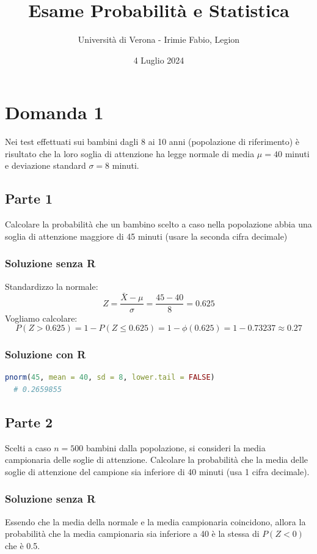 \documentclass[a4paper]{article}
\theoremstyle{break}
\theoremstyle{break}
\theoremstyle{break}
\theoremstyle{break}
\begin{document}
\title{Esame Probabilità e Statistica}
\author{Università di Verona - Irimie Fabio, Legion}
\date{4 Luglio 2024}
\maketitle

\tableofcontents
\pagebreak

\section{Domanda 1}
Nei test effettuati sui bambini dagli 8 ai 10 anni (popolazione
di riferimento) è risultato che la loro soglia di attenzione ha
legge normale di media \( \mu = 40 \)  minuti e deviazione standard  
\( \sigma = 8 \)  minuti.

\subsection{Parte 1}
Calcolare la probabilità che un bambino scelto a caso nella
popolazione abbia una soglia di attenzione maggiore di 45 minuti
(usare la seconda cifra decimale)

\subsubsection{Soluzione senza R}
Standardizzo la normale:
\[
  Z = \frac{\bar{X} - \mu}{\sigma} = \frac{45 - 40}{8} = 0.625
\] 
Vogliamo calcolare:
\[
P(Z > 0.625) = 1 - P(Z \le 0.625) = 1 - \phi(0.625) = 1 - 0.73237 \approx 0.27
\] 

\subsubsection{Soluzione con R}
\begin{lstlisting}[language=R]
  pnorm(45, mean = 40, sd = 8, lower.tail = FALSE)
  # 0.2659855
\end{lstlisting}

\subsection{Parte 2}
Scelti a caso \( n=500 \) bambini dalla popolazione, si consideri la
media campionaria delle soglie di attenzione. Calcolare la 
probabilità che la media  delle soglie di attenzione del 
campione sia inferiore di 40 minuti (usa 1 cifra decimale).

\subsubsection{Soluzione senza R}
Essendo che la media della normale e la media campionaria coincidono,
allora la probabilità che la media campionaria sia inferiore a 40
è la stessa di \( P(Z < 0) \) che è 0.5.
\end{document}
